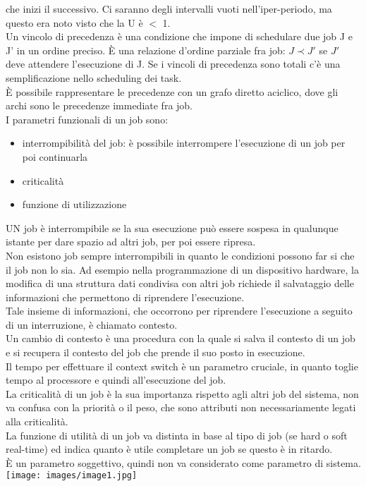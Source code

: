 \documentclass{article}
\begin{document}
che inizi il successivo. Ci saranno degli intervalli vuoti nell'iper-periodo, ma questo era noto visto che la U è $<$ 1.\\ Un vincolo di precedenza è una condizione che impone di schedulare due job J e J' in un ordine preciso. È una relazione d'ordine parziale fra job: $J \prec J'$ se $J'$ deve attendere l'esecuzione di J. Se i vincoli di precedenza sono totali c'è una semplificazione nello scheduling dei task.\\ È possibile rappresentare le precedenze con un grafo diretto aciclico, dove gli archi sono le precedenze immediate fra job.\\ I parametri funzionali di un job sono:
\begin{itemize}
\item interrompibilità del job: è possibile interrompere l'esecuzione di un job per poi continuarla
\item criticalità
\item funzione di utilizzazione
\end{itemize}
UN job è interrompibile se la sua esecuzione può essere sospesa in qualunque istante per dare spazio ad altri job, per poi essere ripresa.\\ Non esistono job sempre interrompibili in quanto le condizioni possono far si che il job non lo sia. Ad esempio nella programmazione di un dispositivo hardware, la modifica di una struttura dati condivisa con altri job richiede il salvataggio delle informazioni che permettono di riprendere l'esecuzione.\\ Tale insieme di informazioni, che occorrono per riprendere l'esecuzione a seguito di un interruzione, è chiamato contesto.\\ Un cambio di contesto è una procedura con la quale si salva il contesto di un job e si recupera il contesto del job che prende il suo posto in esecuzione.\\ Il tempo per effettuare il context switch è un parametro cruciale, in quanto toglie tempo al processore e quindi all'esecuzione del job.\\ La criticalità di un job è la sua importanza rispetto agli altri job del sistema, non va confusa con la priorità o il peso, che sono attributi non necessariamente legati alla criticalità.\\ La funzione di utilità di un job va distinta in base al tipo di job (se hard o soft real-time) ed indica quanto è utile completare un job se questo è in ritardo.\\ È un parametro soggettivo, quindi non va considerato come parametro di sistema.\\
\texttt{[image: images/image1.jpg]}\\
\end{document}
